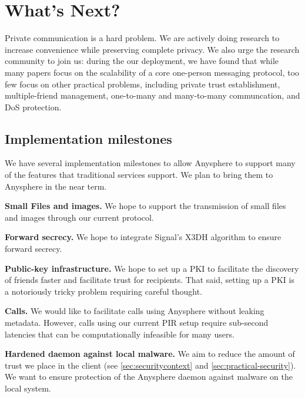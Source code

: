 \section{What's Next?}
\label{sec:future}

Private communication is a hard problem. We are actively doing research to increase convenience while preserving complete privacy. We also urge the research community to join us: during the our deployment, we have found that while many papers focus on the scalability of a core one-person messaging protocol, too few focus on other practical problems, including private trust establishment, multiple-friend management, one-to-many and many-to-many communcation, and DoS protection.


\subsection{Implementation milestones}
We have several implementation milestones to allow Anysphere to support many of the features that traditional services support. We plan to bring them to Anysphere in the near term.

\textbf{Small Files and images.} We hope to support the transmission of small files and images through our current protocol.

\textbf{Forward secrecy.} We hope to integrate Signal's X3DH algorithm to ensure forward secrecy.

\textbf{Public-key infrastructure.} We hope to set up a PKI to facilitate the discovery of friends faster and facilitate trust for recipients. That said, setting up a PKI is a notoriously tricky problem requiring careful thought.

\textbf{Calls.} We would like to facilitate calls using Anysphere without leaking metadata. However, calls using our current PIR setup require sub-second latencies that can be computationally infeasible for many users.

\textbf{Hardened daemon against local malware.} We aim to reduce the amount of trust we place in the client (see \cref{sec:securitycontext} and \cref{sec:practical-security}). We want to ensure protection of the Anysphere daemon against malware on the local system.

